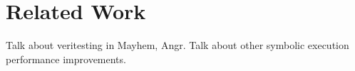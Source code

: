 \section{Related Work}
Talk about veritesting in Mayhem, Angr.
Talk about other symbolic execution performance improvements.